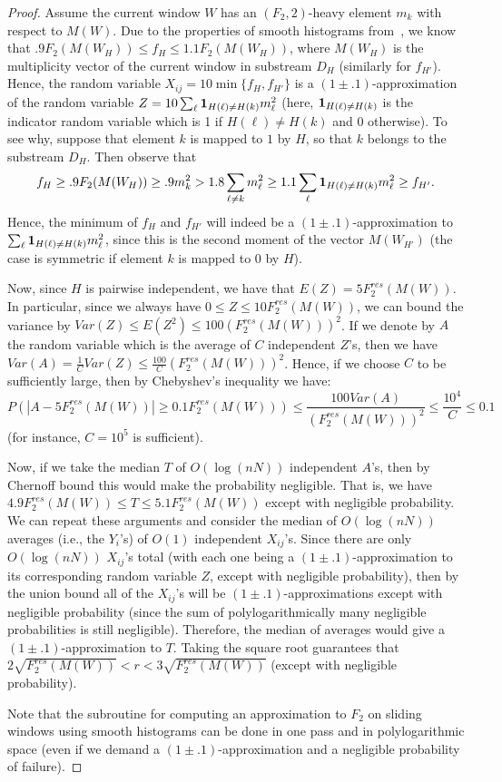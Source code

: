 \documentclass[11pt]{article}
\begin{document}
\begin{proof}
Assume the current window $W$ has an $(F_2,2)$-heavy element $m_k$ with respect to $M(W)$.  Due to the properties of smooth
histograms from~\cite{BO07}, we know that $.9F_2(M(W_H)) \leq f_H \leq 1.1F_2(M(W_H))$, where $M(W_H)$ is the multiplicity vector
of the current window in substream $D_H$ (similarly for $f_{H'}$).  Hence, the random variable $X_{ij} = 10\min\{f_H,f_{H'}\}$
is a $(1 \pm .1)$-approximation of the random variable $Z = 10\sum_{\ell} {\bf 1}_{H(\ell) \neq H(k)} m_\ell^2$ (here, ${\bf 1}_{H(\ell) \neq H(k)}$
is the indicator random variable which is 1 if $H(\ell) \neq H(k)$ and 0 otherwise).  To see why, suppose that element $k$ is mapped to $1$ by $H$,
so that $k$ belongs to the substream $D_H$.  Then observe that
$$f_H \geq .9F_2(M(W_H)) \geq .9m_k^2 > 1.8\sum_{\ell \neq k}m_\ell^2 \geq 1.1\sum_{\ell}{\bf 1}_{H(\ell) \neq H(k)}m_\ell^2 \geq f_{H'}.$$
Hence, the minimum of $f_H$ and $f_{H'}$ will indeed be a $(1 \pm .1)$-approximation to $\sum_{\ell} {\bf 1}_{H(\ell) \neq H(k)} m_\ell^2$,
since this is the second moment of the vector $M(W_{H'})$ (the case is symmetric if element $k$ is mapped to $0$ by $H$).

Now, since $H$ is pairwise independent, we have that $E(Z) = 5F_2^{res}(M(W))$.  In particular, since we always have $0 \leq Z \leq 10F_2^{res}(M(W))$,
we can bound the variance by $Var(Z) \leq E(Z^2) \leq 100 (F_2^{res}(M(W)))^2$.  If we denote by $A$ the random variable which is the average
of $C$ independent $Z$'s, then we have $Var(A) = \frac{1}{C}Var(Z) \leq \frac{100}{C}(F_2^{res}(M(W)))^2$.  Hence, if we choose $C$ to be sufficiently
large, then by Chebyshev's inequality we have:
$$ P(|A - 5F_2^{res}(M(W))| \geq 0.1F_2^{res}(M(W))) \leq \frac{100Var(A)}{(F_2^{res}(M(W)))^2} \leq \frac{10^4}{C} \leq 0.1$$
(for instance, $C = 10^5$ is sufficient).

Now, if we take the median $T$ of $O(\log (nN))$ independent $A$'s, then by Chernoff bound this would make the probability negligible.
That is, we have $4.9F_2^{res}(M(W)) \leq T \leq 5.1F_2^{res}(M(W))$ except with negligible probability.  We can
repeat these arguments and consider the median of $O(\log(nN))$ averages (i.e., the $Y_i$'s) of $O(1)$ independent $X_{ij}$'s.  Since
there are only $O(\log(nN))$ $X_{ij}$'s total (with each one being a $(1 \pm .1)$-approximation to its corresponding random variable $Z$,
except with negligible probability), then by the union bound all of the $X_{ij}$'s will be $(1 \pm .1)$-approximations except with negligible probability
(since the sum of polylogarithmically many negligible probabilities is still negligible).  Therefore, the median of averages would give a
$(1 \pm .1)$-approximation to $T$.  Taking the square root guarantees that $2\sqrt{F_2^{res}(M(W))} < r < 3\sqrt{F_2^{res}(M(W))}$ (except with negligible
probability).

Note that the subroutine for computing an approximation to $F_2$ on sliding windows using smooth histograms can be done in one pass and
in polylogarithmic space (even if we demand a $(1 \pm .1)$-approximation and a negligible probability of failure).
\end{proof}
\end{document}

